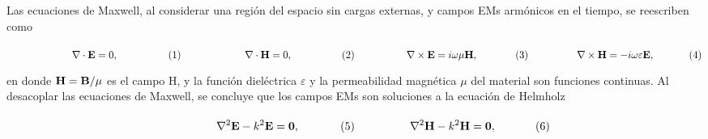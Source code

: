 Las ecuaciones de Maxwell, al considerar una región del espacio sin cargas externas, y campos EMs armónicos en el tiempo, se reescriben como \cite{jackson1999electrodynamics}

	\begin{subequations}
	\eqhalf{\nabla\cdot \vb{E} = 0, }
	\eqhalf{\nabla\cdot \vb{H} = 0,}
	\eqhalf{\nabla \times \vb{E} = i\omega\mu \vb{H}, \label{seq:FLArm}}
	\eqhalf{\nabla\times\vb{H} = - i \omega\varepsilon \vb{E}, }	
	\label{eqs:MaxwellArm}
	\end{subequations} \vspace*{-1em}
	
\noindent	
en donde $\vb{H} = \vb{B}/\mu$ es el campo H, y la función dieléctrica $\varepsilon$ y la permeabilidad magnética $\mu$ del material son funciones continuas. Al desacoplar las ecuaciones de Maxwell, se concluye que los campos EMs son soluciones a la ecuación de Helmholz

	\begin{subequations}
	\eqhalf{\nabla^2 \vb{E}- k^2 \vb{E} = \vb{0},}
	\eqhalf{\nabla^2 \vb{H}- k^2 \vb{H} = \vb{0},}
	\label{eq:Helmholtz}
	\end{subequations} \vspace*{-1em}\noindent	
	
